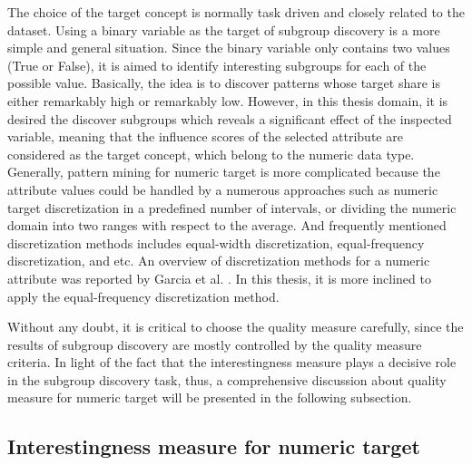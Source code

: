 The choice of the target concept is normally task driven and closely related to the dataset. Using a binary variable as the target of subgroup discovery is a more simple and general situation. Since the binary variable only contains two values (True or False), it is aimed to identify interesting subgroups for each of the possible value. Basically, the idea is to discover patterns whose target share is either remarkably high or remarkably low. However, in this thesis domain, it is desired the discover subgroups which reveals a significant effect of the inspected variable, meaning that the influence scores of the selected attribute are considered as the target concept, which belong to the numeric data type. Generally, pattern mining for numeric target is more complicated because the attribute values could be handled by a numerous approaches such as numeric target discretization in a predefined number of intervals, or dividing the numeric domain into two ranges with respect to the average. And frequently mentioned discretization methods includes equal-width discretization, equal-frequency discretization, and etc. An overview of discretization methods for a numeric attribute was reported by Garcia et al. \cite{garcia2012survey}. In this thesis, it is more inclined to apply the equal-frequency discretization method. 

Without any doubt, it is critical to choose the quality measure carefully, since the results of subgroup discovery are mostly controlled by the quality measure criteria. In light of the fact that the interestingness measure plays a decisive role in the subgroup discovery task, thus, a comprehensive discussion about quality measure for numeric target will be presented in the following subsection.

\subsection{Interestingness measure for numeric target}

% 


